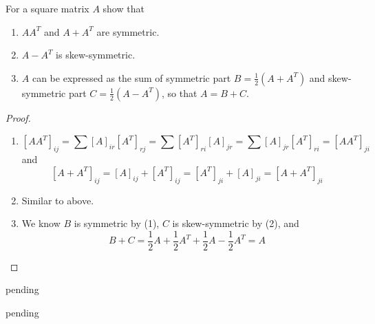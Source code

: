 \begin{problem} \label{P.1.11}
    For a square matrix \( A \) show that 
    \begin{enumerate}
        \item \( AA^T \) and \( A+A^T \) are symmetric. 
        \item \( A - A^T \) is skew-symmetric.
        \item \( A \) can be expressed as the sum of symmetric part \( B = \frac{1}{2}(A+A^T) \) and skew-symmetric part \( C = \frac{1}{2}(A-A^T) \), so that \( A = B+C \).
    \end{enumerate}
    
    \begin{proof}
        \begin{enumerate}
            \item
            \[
            [AA^T]_{ij} = \sum [A]_{ir}[A^T]_{rj} = \sum [A^T]_{ri}[A]_{jr} = \sum [A]_{jr}[A^T]_{ri} = [AA^T]_{ji}
            \]
            and
            \[
            [A+A^T]_{ij} = [A]_{ij} + [A^T]_{ij} = [A^T]_{ji} + [A]_{ji} = [A+A^T]_{ji}
            \]
            
            \item Similar to above.
            
            \item We know \( B \) is symmetric by (1), \( C \) is skew-symmetric by (2), and 
            \[
            B+C = \frac{1}{2}A + \frac{1}{2}A^T + \frac{1}{2}A - \frac{1}{2}A^T = A
            \]
        \end{enumerate}
    \end{proof}
\end{problem}

\begin{problem} \label{P.1.12}
    pending
\end{problem}

\begin{problem} \label{P.1.13}
    pending
\end{problem}

